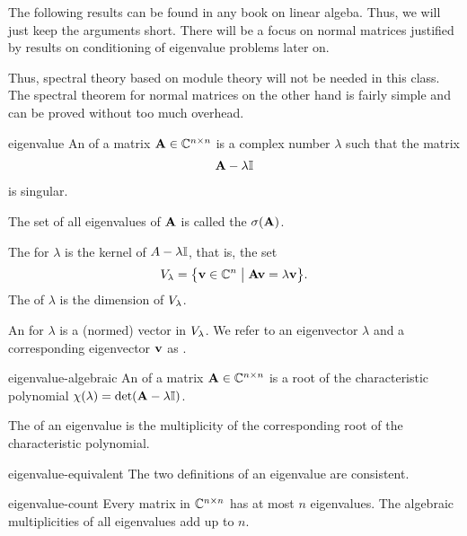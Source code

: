 \begin{intro}
  The following results can be found in any book on linear
  algeba. Thus, we will just keep the arguments short. There will be a
  focus on normal matrices justified by results on conditioning of
  eigenvalue problems later on.

  Thus, spectral theory based on module theory will not be needed in
  this class. The spectral theorem for normal matrices on the other
  hand is fairly simple and can be proved without too much overhead.
\end{intro}

\begin{Definition}{eigenvalue}
  An  of a matrix $\mathbf A\in \mathbb C^{n\times n}$ is a
  complex number $\lambda$ such that the matrix
  \begin{gather}
   \mathbf A-\lambda\mathbb I 
  \end{gather}
  is singular.

  The set of all eigenvalues of $\mathbf A$ is called the
   $\sigma(\mathbf A)$.

  The  for $\lambda$ is the kernel of
  $A-\lambda\mathbb I$, that is, the set
\begin{gather}
    V_{\lambda} = \bigl\{
    \mathbf v \in \mathbb C^n \;\big\vert\;
    \mathbf A\mathbf v = \lambda\mathbf v \bigr\}.
\end{gather}
The  of $\lambda$ is the dimension of
$V_{\lambda}$.


An  for $\lambda$ is a (normed) vector in
$V_{\lambda}$. We refer to an eigenvector $\lambda$ and a
corresponding eigenvector $\mathbf v$ as .
\end{Definition}

\begin{Definition}{eigenvalue-algebraic}
  An  of a matrix $\mathbf A\in \mathbb C^{n\times n}$ is a root of the characteristic polynomial $\chi(\lambda) = \det(\mathbf A-\lambda\mathbb I)$.
  
  The  of an eigenvalue is the multiplicity of the corresponding root of the characteristic polynomial.
\end{Definition}

\begin{Lemma}{eigenvalue-equivalent}
  The two definitions of an eigenvalue are consistent.
\end{Lemma}

\begin{Theorem}{eigenvalue-count}
  Every matrix in $\mathbb C^{n\times n}$ has at most $n$ eigenvalues. The algebraic multiplicities of all eigenvalues add up to $n$.
\end{Theorem}


